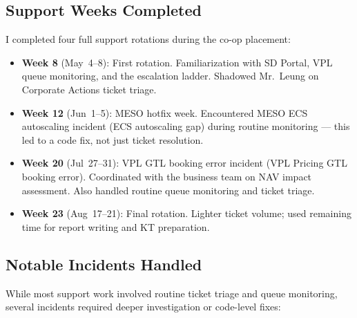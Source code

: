 \subsection{Support Weeks Completed}

I completed four full support rotations during the co-op placement:

\begin{itemize}
    \item \textbf{Week 8} (May~4--8): First rotation. Familiarization with
          SD Portal, VPL queue monitoring, and the escalation ladder.
          Shadowed Mr.\ Leung on Corporate Actions ticket triage.

    \item \textbf{Week 12} (Jun~1--5): MESO hotfix week. Encountered
          MESO ECS autoscaling incident (ECS autoscaling gap) during routine monitoring ---
          this led to a code fix, not just ticket resolution.

    \item \textbf{Week 20} (Jul~27--31): VPL GTL booking error incident (VPL Pricing GTL booking
          error). Coordinated with the business team on NAV impact
          assessment. Also handled routine queue monitoring and ticket
          triage.

    \item \textbf{Week 23} (Aug~17--21): Final rotation. Lighter ticket
          volume; used remaining time for report writing and KT preparation.
\end{itemize}

\subsection{Notable Incidents Handled}

While most support work involved routine ticket triage and queue monitoring,
several incidents required deeper investigation or code-level fixes:

